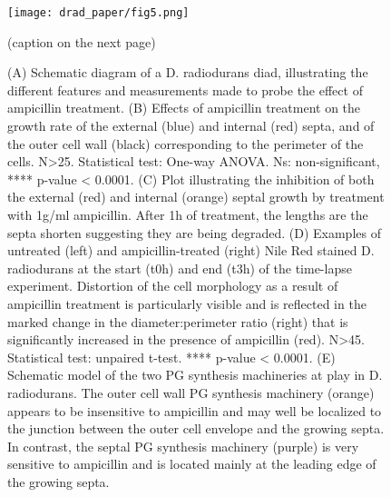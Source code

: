 \begin{figure}[ht]
    \centering
    \texttt{[image: drad\_paper/fig5.png]}
    \caption[Distinct PG synthesis machineries are involved in septal and outer cell wall growth]{(caption on the next page)}
    \label{drad_fig5}
\end{figure}
\begin{figure}[ht]
    \ContinuedFloat
    \caption{(A) Schematic diagram of a D. radiodurans diad, illustrating the different features and measurements made to probe the effect of ampicillin treatment. (B) Effects of ampicillin treatment on the growth rate of the external (blue) and internal (red) septa, and of the outer cell wall (black) corresponding to the perimeter of the cells. N>25. Statistical test: One-way ANOVA. Ns: non-significant, **** p-value < 0.0001. (C) Plot illustrating the inhibition of both the external (red) and internal (orange) septal growth by treatment with 1\mu{}g/ml ampicillin. After 1h of treatment, the lengths are the septa shorten suggesting they are being degraded. (D) Examples of untreated (left) and ampicillin-treated (right) Nile Red stained D. radiodurans at the start (t0h) and end (t3h) of the time-lapse experiment. Distortion of the cell morphology as a result of ampicillin treatment is particularly visible and is reflected in the marked change in the diameter:perimeter ratio (right) that is significantly increased in the presence of ampicillin (red). N>45. Statistical test: unpaired t-test. **** p-value < 0.0001. (E) Schematic model of the two PG synthesis machineries at play in D. radiodurans. The outer cell wall PG synthesis machinery (orange) appears to be insensitive to ampicillin and may well be localized to the junction between the outer cell envelope and the growing septa. In contrast, the septal PG synthesis machinery (purple) is very sensitive to ampicillin and is located mainly at the leading edge of the growing septa.}
\end{figure}

